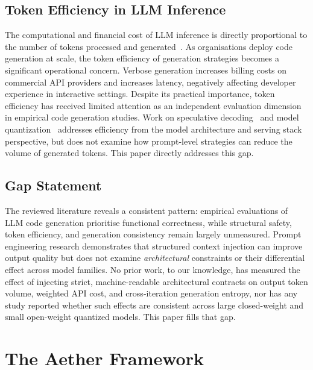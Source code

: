 \documentclass[review,12pt,3p]{elsarticle}
\begin{document}
\subsection{Token Efficiency in LLM Inference}

The computational and financial cost of LLM inference is directly proportional to the
number of tokens processed and generated~\citep{Sharir2020CostNLP}. As organisations
deploy code generation at scale, the token efficiency of generation strategies becomes
a significant operational concern. Verbose generation increases billing costs on commercial
API providers and increases latency, negatively affecting developer experience in interactive
settings. Despite its practical importance, token efficiency has received limited attention
as an independent evaluation dimension in empirical code generation studies. Work on
speculative decoding~\citep{Leviathan2023Speculative} and model quantization~\citep{Dettmers2022LLMInt8}
addresses efficiency from the model architecture and serving stack perspective, but does not
examine how prompt-level strategies can reduce the volume of generated tokens. This paper
directly addresses this gap.

\subsection{Gap Statement}

The reviewed literature reveals a consistent pattern: empirical evaluations of LLM code
generation prioritise functional correctness, while structural safety, token efficiency, and
generation consistency remain largely unmeasured. Prompt engineering research demonstrates
that structured context injection can improve output quality but does not examine
\emph{architectural} constraints or their differential effect across model families. No
prior work, to our knowledge, has measured the effect of injecting strict, machine-readable
architectural contracts on output token volume, weighted API cost, and cross-iteration
generation entropy, nor has any study reported whether such effects are consistent across
large closed-weight and small open-weight quantized models. This paper fills that gap.

\section{The Aether Framework}
\label{sec:framework}
\end{document}
